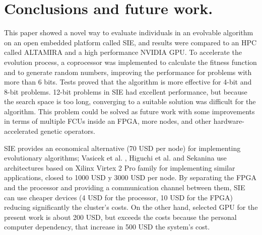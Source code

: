 \documentclass[runningheads,a4paper]{llncs}
\begin{document}
\section{Conclusions and future work.}
This paper showed a novel way to evaluate individuals in an evolvable algorithm on an open embedded platform called SIE, and results were compared to an HPC called ALTAMIRA and a high performance NVIDIA GPU. To accelerate the evolution process, a coprocessor was implemented to calculate the fitness function and to generate random numbers, improving the performance for problems with more than 6 bits. Tests proved that the algorithm is more effective for 4-bit and 8-bit problems. 12-bit problems in SIE had excellent performance, but because the search space is too long, converging to a suitable solution was difficult for the algorithm. This problem could be solved as future work with some improvements in terms of multiple FCUs inside an FPGA, more nodes, and other hardware-accelerated genetic operators.

SIE provides an economical alternative (70 USD per node) for implementing evolutionary algorithms; Vasicek et al. \cite{RORA+07}, Higuchi et al. \cite{JJPR} and Sekanina\cite{ZVLS07} use architectures based on Xilinx Virtex 2 Pro family for implementing similar applications, closed to 1000 USD y 3000 USD per node.  By separating the FPGA and the processor and providing a communication channel between them, SIE can use cheaper devices (4 USD for the processor, 10 USD for the FPGA) reducing significantly the cluster's costs. On the other hand, selected GPU for the present work is about 200 USD, but exceeds the costs because the personal computer dependency, that increase in 500 USD the system's cost.



\end{document}

